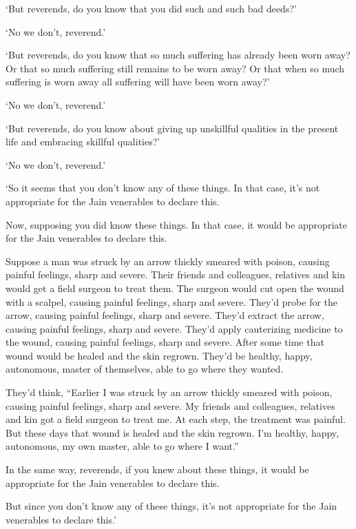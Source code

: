 \documentclass[12pt,openany]{book}%
\begin{document}
‘But reverends, do you know that you did such and such bad deeds?’ 

‘No we don’t, reverend.’ 

‘But reverends, do you know that so much suffering has already been worn away? Or that so much suffering still remains to be worn away? Or that when so much suffering is worn away all suffering will have been worn away?’ 

‘No we don’t, reverend.’ 

‘But reverends, do you know about giving up unskillful qualities in the present life and embracing skillful qualities?’ 

‘No we don’t, reverend.’ 

‘So it seems that you don’t know any of these things. In that case, it’s not appropriate for the Jain venerables to declare this. 

Now, supposing you did know these things. In that case, it would be appropriate for the Jain venerables to declare this. 

Suppose a man was struck by an arrow thickly smeared with poison, causing painful feelings, sharp and severe. Their friends and colleagues, relatives and kin would get a field surgeon to treat them. The surgeon would cut open the wound with a scalpel, causing painful feelings, sharp and severe. They’d probe for the arrow, causing painful feelings, sharp and severe. They’d extract the arrow, causing painful feelings, sharp and severe. They’d apply cauterizing medicine to the wound, causing painful feelings, sharp and severe. After some time that wound would be healed and the skin regrown. They’d be healthy, happy, autonomous, master of themselves, able to go where they wanted. 

They’d think, “Earlier I was struck by an arrow thickly smeared with poison, causing painful feelings, sharp and severe. My friends and colleagues, relatives and kin got a field surgeon to treat me. At each step, the treatment was painful. But these days that wound is healed and the skin regrown. I’m healthy, happy, autonomous, my own master, able to go where I want.” 

In the same way, reverends, if you knew about these things, it would be appropriate for the Jain venerables to declare this. 

But since you don’t know any of these things, it’s not appropriate for the Jain venerables to declare this.’ 
\end{document}

